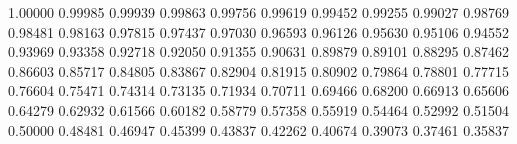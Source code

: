\def\pgfmatharccos#1{%
	\pgfmathparse{#1}%
	\expandafter\pgfmatharccos@\expandafter{\pgfmathresult}}
\def\pgfmatharccos@#1{%
	\begingroup%
		\pgfmath@x\pgfmath@pi pt\relax%
		\divide\pgfmath@x2\relax%
		\pgfmatharcsin@{#1}%
		\advance\pgfmath@x-\pgfmathresult pt\relax%
		\pgfmath@returnone\pgfmath@x%
	\endgroup%
}
	
\def\pgfmath@def#1#2#3{\expandafter\def\csname pgfmath@#1@#2\endcsname{#3}}
\pgfmath@def{cos}{0}{1.00000}		\pgfmath@def{cos}{1}{0.99985}
\pgfmath@def{cos}{2}{0.99939}		\pgfmath@def{cos}{3}{0.99863}
\pgfmath@def{cos}{4}{0.99756}		\pgfmath@def{cos}{5}{0.99619}
\pgfmath@def{cos}{6}{0.99452}		\pgfmath@def{cos}{7}{0.99255}
\pgfmath@def{cos}{8}{0.99027}		\pgfmath@def{cos}{9}{0.98769}
\pgfmath@def{cos}{10}{0.98481}		\pgfmath@def{cos}{11}{0.98163}
\pgfmath@def{cos}{12}{0.97815}		\pgfmath@def{cos}{13}{0.97437}
\pgfmath@def{cos}{14}{0.97030}		\pgfmath@def{cos}{15}{0.96593}
\pgfmath@def{cos}{16}{0.96126}		\pgfmath@def{cos}{17}{0.95630}
\pgfmath@def{cos}{18}{0.95106}		\pgfmath@def{cos}{19}{0.94552}
\pgfmath@def{cos}{20}{0.93969}		\pgfmath@def{cos}{21}{0.93358}
\pgfmath@def{cos}{22}{0.92718}		\pgfmath@def{cos}{23}{0.92050}
\pgfmath@def{cos}{24}{0.91355}		\pgfmath@def{cos}{25}{0.90631}
\pgfmath@def{cos}{26}{0.89879}		\pgfmath@def{cos}{27}{0.89101}
\pgfmath@def{cos}{28}{0.88295}		\pgfmath@def{cos}{29}{0.87462}
\pgfmath@def{cos}{30}{0.86603}		\pgfmath@def{cos}{31}{0.85717}
\pgfmath@def{cos}{32}{0.84805}		\pgfmath@def{cos}{33}{0.83867}
\pgfmath@def{cos}{34}{0.82904}		\pgfmath@def{cos}{35}{0.81915}
\pgfmath@def{cos}{36}{0.80902}		\pgfmath@def{cos}{37}{0.79864}
\pgfmath@def{cos}{38}{0.78801}		\pgfmath@def{cos}{39}{0.77715}
\pgfmath@def{cos}{40}{0.76604}		\pgfmath@def{cos}{41}{0.75471}
\pgfmath@def{cos}{42}{0.74314}		\pgfmath@def{cos}{43}{0.73135}
\pgfmath@def{cos}{44}{0.71934}		\pgfmath@def{cos}{45}{0.70711}
\pgfmath@def{cos}{46}{0.69466}		\pgfmath@def{cos}{47}{0.68200}
\pgfmath@def{cos}{48}{0.66913}		\pgfmath@def{cos}{49}{0.65606}
\pgfmath@def{cos}{50}{0.64279}		\pgfmath@def{cos}{51}{0.62932}
\pgfmath@def{cos}{52}{0.61566}		\pgfmath@def{cos}{53}{0.60182}
\pgfmath@def{cos}{54}{0.58779}		\pgfmath@def{cos}{55}{0.57358}
\pgfmath@def{cos}{56}{0.55919}		\pgfmath@def{cos}{57}{0.54464}
\pgfmath@def{cos}{58}{0.52992}		\pgfmath@def{cos}{59}{0.51504}
\pgfmath@def{cos}{60}{0.50000}		\pgfmath@def{cos}{61}{0.48481}
\pgfmath@def{cos}{62}{0.46947}		\pgfmath@def{cos}{63}{0.45399}
\pgfmath@def{cos}{64}{0.43837}		\pgfmath@def{cos}{65}{0.42262}
\pgfmath@def{cos}{66}{0.40674}		\pgfmath@def{cos}{67}{0.39073}
\pgfmath@def{cos}{68}{0.37461}		\pgfmath@def{cos}{69}{0.35837}
